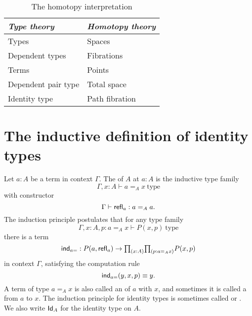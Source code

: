 \begin{table}
\begin{center}
\caption{\label{tab:homotopy_interpretation}The homotopy interpretation}
\begin{tabular}{ll}
\toprule
\emph{Type theory} &  \emph{Homotopy theory} \\
\midrule
Types  & Spaces \\
Dependent types & Fibrations \\
Terms & Points \\
Dependent pair type & Total space \\
Identity type & Path fibration\\
\bottomrule
\end{tabular}
\end{center}
\end{table}

\section{The inductive definition of identity types}

Let $a:A$ be a term in context $\Gamma$. The  of $A$ at $a:A$ is the inductive type family 
\begin{equation*}
\Gamma,x:A\vdash a =_A x~\mathrm{type}
\end{equation*}
with constructor
\begin{equation*}
\Gamma\vdash \mathsf{refl}_{a} : a=_A a.
\end{equation*}
The induction principle postulates that for any type family
\begin{equation*}
\Gamma,x:A,p: a=_A x\vdash P(x,p)~\mathrm{type}
\end{equation*}
there is a term
\begin{equation*}
\ind{a=} : P(a,\refl{a})\to \prd{x:A}{p:a=_A x}P(x,p)
\end{equation*}
in context $\Gamma$, satisfying the computation rule
\begin{equation*}
\mathsf{ind}_{a=}(y,x,p)\equiv y.
\end{equation*}
A term of type $a=_A x$ is also called an  of $a$ with $x$, and sometimes it is called a  from $a$ to $x$.
The induction principle for identity types is sometimes called  or . We also write $\mathsf{Id}_{A}$ for the identity type on $A$. 

